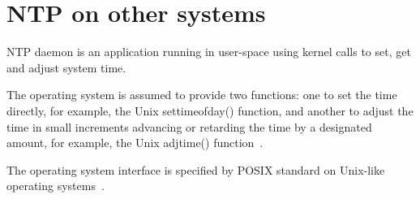 
\chapter{NTP on other systems} %
NTP daemon is an application running in user-space using kernel calls to set, get and
adjust system time.

The operating system is assumed to provide two
functions: one to set the time directly, for example, the Unix
settimeofday() function, and another to adjust the time in small
increments advancing or retarding the time by a designated amount,
for example, the Unix adjtime() function~\cite{rfc5905}.

The operating system interface is specified by POSIX standard on Unix-like operating systems~\cite{posix}.





